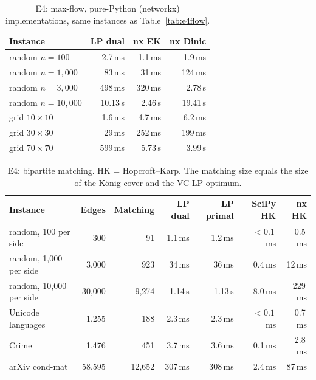 \begin{table}[H]
  \centering\small
  \caption{E4: max-flow, pure-Python (networkx) implementations, same instances as Table~\ref{tab:e4flow}.}
  \label{tab:e4flownx}
  \begin{tabular}{@{}lrrr@{}}
    \toprule
    Instance & LP dual & nx EK & nx Dinic \\
    \midrule
    random $n=100$ & 2.7\,ms & 1.1\,ms & 1.9\,ms \\
    random $n=1{,}000$ & 83\,ms & 31\,ms & 124\,ms \\
    random $n=3{,}000$ & 498\,ms & 320\,ms & 2.78\,s \\
    random $n=10{,}000$ & 10.13\,s & 2.46\,s & 19.41\,s \\
    grid $10\times10$ & 1.6\,ms & 4.7\,ms & 6.2\,ms \\
    grid $30\times30$ & 29\,ms & 252\,ms & 199\,ms \\
    grid $70\times70$ & 599\,ms & 5.73\,s & 3.99\,s \\
    \bottomrule
  \end{tabular}
\end{table}

\begin{table}[H]
  \centering\small
  \caption{E4: bipartite matching. HK = Hopcroft--Karp. The matching size equals the size of the König cover and the VC LP optimum.}
  \label{tab:e4match}
  \begin{tabular}{@{}lrrrrrr@{}}
    \toprule
    Instance & Edges & Matching & LP dual & LP primal & SciPy HK & nx HK \\
    \midrule
    random, 100 per side    & 300    & 91     & 1.1\,ms & 1.2\,ms & $<0.1$\,ms & 0.5\,ms \\
    random, 1,000 per side  & 3,000  & 923    & 34\,ms  & 36\,ms  & 0.4\,ms    & 12\,ms \\
    random, 10,000 per side & 30,000 & 9,274  & 1.14\,s & 1.13\,s & 8.0\,ms    & 229\,ms \\
    Unicode languages       & 1,255  & 188    & 2.3\,ms & 2.3\,ms & $<0.1$\,ms & 0.7\,ms \\
    Crime                   & 1,476  & 451    & 3.7\,ms & 3.6\,ms & 0.1\,ms    & 2.8\,ms \\
    arXiv cond-mat          & 58,595 & 12,652 & 307\,ms & 308\,ms & 2.4\,ms    & 87\,ms \\
    \bottomrule
  \end{tabular}
\end{table}

